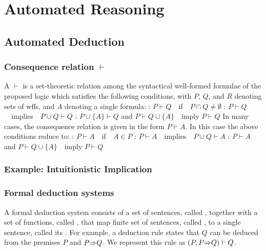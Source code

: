\chapter{Automated Reasoning}

\section{Automated Deduction}
\subsection{Consequence relation $\vdash$} 
A  $\vdash$ is a set-theoretic relation among the
syntactical well-formed formulae of the proposed logic which satisfies the
following conditions, with $P$, $Q$, and $R$ denoting sets of wffs, and
$A$ denoting a single formula:
  \ben
  \w [(a)] : $P \vdash Q$\ \ if\ \ $P \cap Q \ne \emptyset$
  \w [(b)] : $P \vdash Q$\ \ implies\ \ $P \cup Q \vdash Q$
  \w [(c)] : $P \cup \{A\} \vdash Q$ and $P \vdash Q
  \cup \{A\}$\ \ imply $P \vdash Q$
  \een
In many cases, the consequence relation is given in the form $P \vdash A$.
In this case the above conditions reduce to:
  \ben
  \w [(a)] : $P \vdash A$\ \ if\ \ $A \in P$
  \w [(b)] : $P \vdash A$\ \ implies\ \ $P \cup Q \vdash A$
  \w [(c)] : $P \vdash A$ and $P \vdash Q \cup
  \{A\}$\ \ imply $P \vdash Q$ 
  \een

\subsection{Example: Intuitionistic Implication}

\subsection{Formal deduction systems}
A formal deduction system consists of a set of sentences, called ,
together with a set of functions, called , that map finite
set of sentences, called , to a single sentence, called its
. 
For example, a deduction rule states that $Q$ can be deduced from the premises
$P$ and $P \mbox{$\Rightarrow$} Q$. We represent this rule as $(P, P \mbox{$\Rightarrow$} Q) \vdash Q$.


